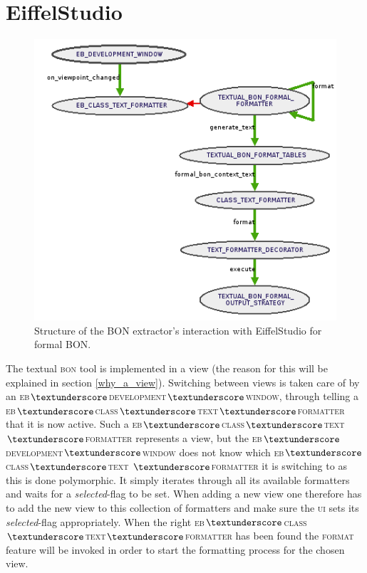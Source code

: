 \section{EiffelStudio}
\begin{figure}[H]
\centerline{
\includegraphics[scale=0.7]{images/BON-extractor-structure-large.png}
}
\caption{Structure of the BON extractor's interaction with EiffelStudio for formal BON.}
\label{fig:extractor_structure}
\end{figure}
\label{implementation_eiffelstudio}
The textual \textsc{bon} tool is implemented in a view (the reason for this will be explained in section \ref{why_a_view}). Switching between views is taken care of by an \textsc{eb$\textunderscore$development$\textunderscore$window}, through telling a \textsc{eb$\textunderscore$class$\textunderscore$text$\textunderscore$formatter} that it is now active. Such a \textsc{eb$\textunderscore$class$\textunderscore$text$\textunderscore$formatter} represents a view, but the \textsc{eb$\textunderscore$development$\textunderscore$window} does not know which \textsc{eb$\textunderscore$class$\textunderscore$text} \textsc{$\textunderscore$formatter} it is switching to as this is done polymorphic. It simply iterates through all its available formatters and waits for a \textit{selected}-flag to be set. When adding a new view one therefore has to add the new view to this collection of formatters and make sure the \textsc{ui} sets its \textit{selected}-flag appropriately. When the right \textsc{eb$\textunderscore$class$\textunderscore$text$\textunderscore$formatter} has been found the \textsc{format} feature will be invoked in order to start the formatting process for the chosen view.

